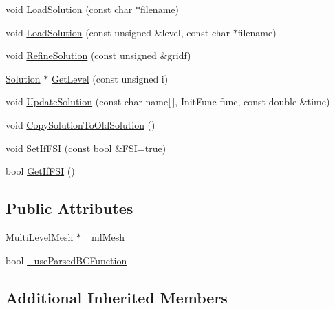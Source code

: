 \begin{DoxyCompactItemize}
\item 
void \mbox{\hyperlink{classfemus_1_1_multi_level_solution_a7e900e00aa10fddcd32ea102ba109f93}{Load\+Solution}} (const char $\ast$filename)
\item 
void \mbox{\hyperlink{classfemus_1_1_multi_level_solution_a47cda9ba86a76ae7465798c25525985e}{Load\+Solution}} (const unsigned \&level, const char $\ast$filename)
\item 
void \mbox{\hyperlink{classfemus_1_1_multi_level_solution_a03801744fbed4cae3ac44b36359c12fa}{Refine\+Solution}} (const unsigned \&gridf)
\item 
\mbox{\hyperlink{classfemus_1_1_solution}{Solution}} $\ast$ \mbox{\hyperlink{classfemus_1_1_multi_level_solution_a600a860041eb07386bb5eef32fdd8c1e}{Get\+Level}} (const unsigned i)
\item 
void \mbox{\hyperlink{classfemus_1_1_multi_level_solution_aa16b14e3ad6b6e01e70a7c51ffec17ee}{Update\+Solution}} (const char name\mbox{[}$\,$\mbox{]}, Init\+Func func, const double \&time)
\item 
void \mbox{\hyperlink{classfemus_1_1_multi_level_solution_ae3429a30c2795d3e42820a0f0be6b888}{Copy\+Solution\+To\+Old\+Solution}} ()
\item 
void \mbox{\hyperlink{classfemus_1_1_multi_level_solution_a5664b3c589afbffb8506a8208cdda88f}{Set\+If\+F\+SI}} (const bool \&F\+SI=true)
\item 
bool \mbox{\hyperlink{classfemus_1_1_multi_level_solution_a61e9f1086f338caabe915b1373168255}{Get\+If\+F\+SI}} ()
\end{DoxyCompactItemize}
\subsection*{Public Attributes}
\begin{DoxyCompactItemize}
\item 
\mbox{\hyperlink{classfemus_1_1_multi_level_mesh}{Multi\+Level\+Mesh}} $\ast$ \mbox{\hyperlink{classfemus_1_1_multi_level_solution_a0b3054885210f9a51ebff160e52ec2df}{\+\_\+ml\+Mesh}}
\item 
bool \mbox{\hyperlink{classfemus_1_1_multi_level_solution_a58feff3cc4013ccce4b3543afe849ddb}{\+\_\+use\+Parsed\+B\+C\+Function}}
\end{DoxyCompactItemize}
\subsection*{Additional Inherited Members}


